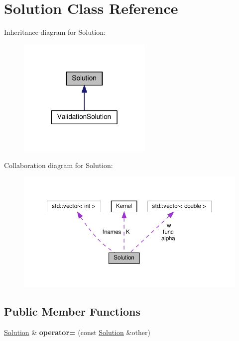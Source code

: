 \hypertarget{class_solution}{}\section{Solution Class Reference}
\label{class_solution}


Inheritance diagram for Solution\+:
\nopagebreak
\begin{figure}[H]
\begin{center}
\leavevmode
\includegraphics[width=182pt]{class_solution__inherit__graph}
\end{center}
\end{figure}


Collaboration diagram for Solution\+:
\nopagebreak
\begin{figure}[H]
\begin{center}
\leavevmode
\includegraphics[width=350pt]{class_solution__coll__graph}
\end{center}
\end{figure}
\subsection*{Public Member Functions}
\begin{DoxyCompactItemize}
\item 
\hyperlink{class_solution}{Solution} \& {\bfseries operator=} (const \hyperlink{class_solution}{Solution} \&other)\hypertarget{class_solution_a8da0e412cdefa6e44c35fc5a8b96ee02}{}\label{class_solution_a8da0e412cdefa6e44c35fc5a8b96ee02}

\end{DoxyCompactItemize}
